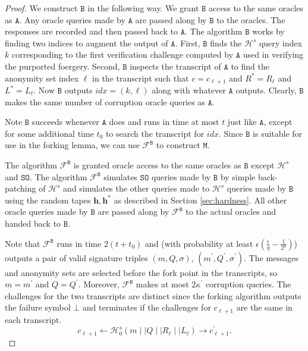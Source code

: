 \documentclass{llncs}
\newcommand{\A}{\texttt{A}}
\newcommand{\B}{\texttt{B}}
\newcommand{\Hs}{\mathcal{H}^s}
\begin{document}
\begin{proof}
We construct $\B$ in the following way. We grant $\B$ access to the same oracles as $\A$. Any oracle queries made by $\A$ are passed along by $\B$ to the oracles. The responses are recorded and then passed back to $\A$. The algorithm $\B$ works by finding two indices to augment the output of $\A$. First, $\B$ finds the $\Hs$ query index $k$ corresponding to the first verification challenge computed by $\A$ used in verifying the purported foergery. Second, $\B$ inspects the transcript of $\A$ to find the anonymity set index $\ell$ in the transcript such that $c = c_{\ell+1}$ and $R^* = R_\ell$ and $L^* = L_\ell$. Now $\B$ outputs $idx = (k, \ell)$ along with whatever $\A$ outputs. Clearly, $\B$ makes the same number of corruption oracle queries as $\A$.

Note $\B$ succeeds whenever $\A$ does and runs in time at most $t$ just like $\A$, except for some additional time $t_0$ to search the transcript for $idx$.  Since $\B$ is suitable for use in the forking lemma, we can use $\mathcal{F}^{\B}$ to construct $\texttt{M}$.

The algorithm $\mathcal{F}^{\B}$ is granted oracle access to the same oracles as $\B$ except $\Hs$ and $\texttt{SO}$. The algorithm $\mathcal{F}^{\B}$ simulates $\texttt{SO}$ queries made by $\B$ by simple back-patching of $\Hs$ and simulates the other queries made to $\Hs$ queries made by $\B$ using the random tapes $\textbf{h}, \textbf{h}^*$ as described in Section \ref{sec:hardness}. All other oracle queries made by $\B$ are passed along by $\mathcal{F}^{\B}$ to the actual oracles and handed back to $\B$.

Note that $\mathcal{F}^{\B}$ runs in time $2(t+t_0)$ and (with probability at least $\epsilon\left(\frac{\epsilon}{q} - \frac{1}{2^\eta}\right)$) outputs a pair of valid signature triples $(m, Q, \sigma)$, $(m^\prime, Q^\prime, \sigma^\prime)$. The messages and anonymity sets are selected before the fork point in the transcripts, so $m=m^\prime$ and $Q=Q^\prime$. Moreover, $\mathcal{F}^{\B}$ makes at most $2\kappa^\prime$ corruption queries. The challenges for the two transcripts are distinct since the forking algorithm outputs the failure symbol $\bot$ and terminates if the challenges for $c_{\ell + 1}$ are the same in each transcript.
\[c_{\ell + 1} \leftarrow \Hs_0(m \mid \mid Q \mid \mid R_\ell \mid \mid L_\ell) \rightarrow c_{\ell+1}^\prime.\]


\end{proof}
\end{document}
